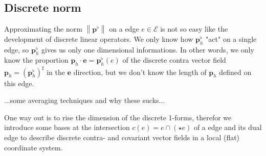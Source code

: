 \documentclass{scrartcl}
\newcommand{\pfl}{\mathbf{p}^{\flat}}
\newcommand{\pflh}{\mathbf{p}^{\flat}_{h}}
\newcommand{\ph}{\mathbf{p}_{h}}
\newcommand{\E}{\mathcal{E}}
\newcommand{\e}{\mathbf{e}}
\begin{document}
  \subsection{Discrete norm}
    
    Approximating the norm \( \left\| \pfl \right\| \) on a edge \( e\in\E \) is not so easy like the development of discrete linear
    operators. 
    We only know how \( \pflh \) "act" on a single edge, so \( \pflh \) gives us only one dimensional informations.
    In other words, we only know the proportion \( \ph \cdot \e = \pflh (e)\) of the discrete contra vector field \( \ph = \left( \pflh \right)^{\sharp} \) in the
    \( \e \) direction, but we don't know the length of \( \ph \) defined on this edge.

    ...some averaging techniques and why these sucks...
   
    One way out is to rise the dimension of the discrete 1-forms, therefor we introduce some bases at the intersection 
    \( c(e) = e\cap (\star e) \) of a edge and its dual edge to describe discrete contra- and covariant vector fields in a local (flat)
    coordinate system.
\end{document}
